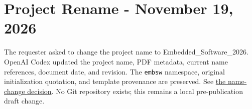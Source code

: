 \section{Project Rename - November 19, 2026}
\label{Section:ProjectRenamePrompt}
The requester asked to change the project name to Embedded\_Software\_2026.
OpenAI Codex updated the project name, PDF metadata, current name references,
document date, and revision. The \texttt{embsw} namespace, original initialization
quotation, and template provenance are preserved. See
\hyperref[Section:ProjectNameUpdate]{the name-change decision}.
No Git repository exists; this remains a local pre-publication draft change.

